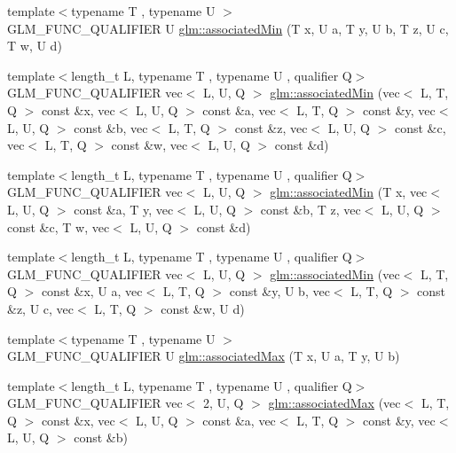 \begin{DoxyCompactItemize}
\item 
{\footnotesize template$<$typename T , typename U $>$ }\\G\+L\+M\+\_\+\+F\+U\+N\+C\+\_\+\+Q\+U\+A\+L\+I\+F\+I\+ER U \hyperlink{group__gtx__associated__min__max_ga432224ebe2085eaa2b63a077ecbbbff6}{glm\+::associated\+Min} (T x, U a, T y, U b, T z, U c, T w, U d)
\item 
{\footnotesize template$<$length\+\_\+t L, typename T , typename U , qualifier Q$>$ }\\G\+L\+M\+\_\+\+F\+U\+N\+C\+\_\+\+Q\+U\+A\+L\+I\+F\+I\+ER vec$<$ L, U, Q $>$ \hyperlink{group__gtx__associated__min__max_ga66b08118bc88f0494bcacb7cdb940556}{glm\+::associated\+Min} (vec$<$ L, T, Q $>$ const \&x, vec$<$ L, U, Q $>$ const \&a, vec$<$ L, T, Q $>$ const \&y, vec$<$ L, U, Q $>$ const \&b, vec$<$ L, T, Q $>$ const \&z, vec$<$ L, U, Q $>$ const \&c, vec$<$ L, T, Q $>$ const \&w, vec$<$ L, U, Q $>$ const \&d)
\item 
{\footnotesize template$<$length\+\_\+t L, typename T , typename U , qualifier Q$>$ }\\G\+L\+M\+\_\+\+F\+U\+N\+C\+\_\+\+Q\+U\+A\+L\+I\+F\+I\+ER vec$<$ L, U, Q $>$ \hyperlink{group__gtx__associated__min__max_ga78c28fde1a7080fb7420bd88e68c6c68}{glm\+::associated\+Min} (T x, vec$<$ L, U, Q $>$ const \&a, T y, vec$<$ L, U, Q $>$ const \&b, T z, vec$<$ L, U, Q $>$ const \&c, T w, vec$<$ L, U, Q $>$ const \&d)
\item 
{\footnotesize template$<$length\+\_\+t L, typename T , typename U , qualifier Q$>$ }\\G\+L\+M\+\_\+\+F\+U\+N\+C\+\_\+\+Q\+U\+A\+L\+I\+F\+I\+ER vec$<$ L, U, Q $>$ \hyperlink{group__gtx__associated__min__max_ga2db7e351994baee78540a562d4bb6d3b}{glm\+::associated\+Min} (vec$<$ L, T, Q $>$ const \&x, U a, vec$<$ L, T, Q $>$ const \&y, U b, vec$<$ L, T, Q $>$ const \&z, U c, vec$<$ L, T, Q $>$ const \&w, U d)
\item 
{\footnotesize template$<$typename T , typename U $>$ }\\G\+L\+M\+\_\+\+F\+U\+N\+C\+\_\+\+Q\+U\+A\+L\+I\+F\+I\+ER U \hyperlink{group__gtx__associated__min__max_ga7d9c8785230c8db60f72ec8975f1ba45}{glm\+::associated\+Max} (T x, U a, T y, U b)
\item 
{\footnotesize template$<$length\+\_\+t L, typename T , typename U , qualifier Q$>$ }\\G\+L\+M\+\_\+\+F\+U\+N\+C\+\_\+\+Q\+U\+A\+L\+I\+F\+I\+ER vec$<$ 2, U, Q $>$ \hyperlink{group__gtx__associated__min__max_ga5c6758bc50aa7fbe700f87123a045aad}{glm\+::associated\+Max} (vec$<$ L, T, Q $>$ const \&x, vec$<$ L, U, Q $>$ const \&a, vec$<$ L, T, Q $>$ const \&y, vec$<$ L, U, Q $>$ const \&b)

\end{DoxyCompactItemize}
